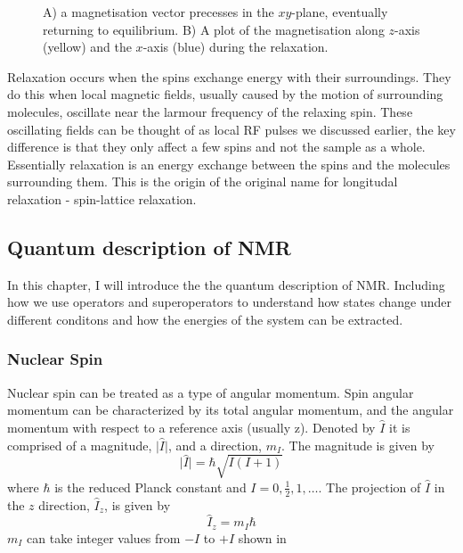\begin{figure}[h]
  \caption{A) a magnetisation vector precesses in the $xy$-plane, eventually returning to equilibrium.
  B) A plot of the magnetisation along $z$-axis (yellow) and the $x$-axis (blue) during the relaxation.}
  \label{fig:t1t2}
\end{figure}

Relaxation occurs when the spins exchange energy with their surroundings. They do
this when local magnetic fields, usually caused by the motion of surrounding molecules, oscillate
near the larmour frequency of the relaxing spin. These oscillating fields can be thought of
as local RF pulses we discussed earlier, the key difference is that they only affect a few spins
and not the sample as a whole. Essentially relaxation is an energy exchange between the
spins and the molecules surrounding them. This is the origin of the original name for longitudal
relaxation - spin-lattice relaxation.

\newpage

\subsection{Quantum description of NMR}\label{Quantum}

In this chapter, I will introduce the the quantum description of NMR. Including how
we use operators and superoperators to understand how states change under different conditons and how the energies of the system can be extracted.

\subsubsection{Nuclear Spin}

Nuclear spin can be treated as a type of angular momentum. Spin angular momentum can be characterized by its total
angular momentum, and the angular momentum with respect to a reference axis (usually z).  Denoted by $\hat{I}$
it is comprised of a magnitude, $\lvert\hat{I}\rvert$, and a direction, $m_I$.
The magnitude is given by
\begin{equation}
  \lvert\hat{I}\rvert = \hbar\sqrt{I(I+1)}
\end{equation}
where $\hbar$ is the reduced Planck constant and $I = 0,\frac{1}{2},1,\dots$. The projection of $\hat{I}$ in
the $z$ direction, $\hat{I}_{z}$, is given by
\begin{equation}
  \hat{I}_{z} = m_I\hbar
\end{equation}
$m_{I}$ can take integer values from $-I$ to $+I$ shown in 

